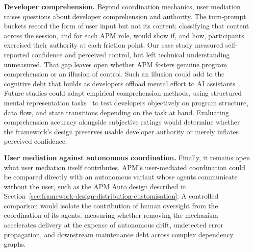 \textbf{Developer comprehension.} Beyond coordination mechanics, user mediation raises questions about developer comprehension and authority. The turn-prompt buckets record the form of user input but not its content; classifying that content across the session, and for each APM role, would show if, and how, participants exercised their authority at each friction point. Our case study measured self-reported confidence and perceived control, but left technical understanding unmeasured. That gap leaves open whether APM fosters genuine program comprehension or an illusion of control. Such an illusion could add to the cognitive debt that builds as developers offload mental effort to AI assistants~\cite{borg2026echoes}. Future studies could adapt empirical comprehension methods, using structured mental representation tasks~\cite{pennington1987stimulus} to test developers objectively on program structure, data flow, and state transitions depending on the task at hand. Evaluating comprehension accuracy alongside subjective ratings would determine whether the framework's design preserves usable developer authority or merely inflates perceived confidence.

\textbf{User mediation against autonomous coordination.} Finally, it remains open what user mediation itself contributes. APM's user-mediated coordination could be compared directly with an autonomous variant whose agents communicate without the user, such as the APM Auto design described in Section~\ref{sec:framework-design-distribution-customisation}. A controlled comparison would isolate the contribution of human oversight from the coordination of its agents, measuring whether removing the mechanism accelerates delivery at the expense of autonomous drift, undetected error propagation, and downstream maintenance debt across complex dependency graphs.
